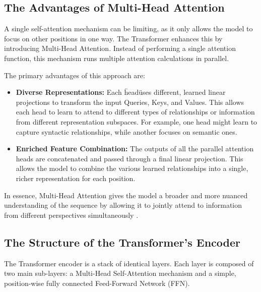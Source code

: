 \subsection{The Advantages of Multi-Head Attention}
A single self-attention mechanism can be limiting, as it only allows the model to focus on other positions in one way. The Transformer enhances this by introducing Multi-Head Attention. Instead of performing a single attention function, this mechanism runs multiple attention calculations in parallel.

The primary advantages of this approach are:
\begin{itemize}
    \item \textbf{Diverse Representations:} Each \"head\" uses different, learned linear projections to transform the input Queries, Keys, and Values. This allows each head to learn to attend to different types of relationships or information from different representation subspaces. For example, one head might learn to capture syntactic relationships, while another focuses on semantic ones.
    \item \textbf{Enriched Feature Combination:} The outputs of all the parallel attention heads are concatenated and passed through a final linear projection. This allows the model to combine the various learned relationships into a single, richer representation for each position.
\end{itemize}
In essence, Multi-Head Attention gives the model a broader and more nuanced understanding of the sequence by allowing it to jointly attend to information from different perspectives simultaneously \citep{vaswani2017attention}.

\subsection{The Structure of the Transformer's Encoder}
The Transformer encoder is a stack of identical layers. Each layer is composed of two main sub-layers: a Multi-Head Self-Attention mechanism and a simple, position-wise fully connected Feed-Forward Network (FFN).

